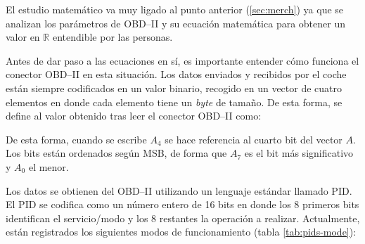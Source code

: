 El estudio matemático va muy ligado al punto anterior (\ref{sec:merch}) ya que se
analizan los parámetros de \ac{OBD}--II y su ecuación matemática para obtener un
valor en $\mathbb{R}$ entendible por las personas.

Antes de dar paso a las ecuaciones en sí, es importante entender cómo funciona
el conector \ac{OBD}--II en esta situación. Los datos enviados y recibidos por
el coche están siempre codificados en un valor binario, recogido en un vector
de cuatro elementos en donde cada elemento tiene un \textit{byte} de tamaño. De
esta forma, se define al valor obtenido tras leer el conector \ac{OBD}--II como:

\begin{table}[H]
  \centering
  \caption{Vector de \textit{bytes} que representa los datos recibidos del conector \ac{OBD}--II \cite{OBDIIPIDs2021}.}
  \label{tab:byte-array}
\end{table}

De esta forma, cuando se escribe $A_4$ se hace referencia al cuarto bit
del vector $A$. Los bits están ordenados según \ac{MSB}, de forma que
$A_7$ es el bit más significativo y $A_0$ el menor.

Los datos se obtienen del \ac{OBD}--II utilizando un lenguaje estándar llamado
\ac{PID}. El \ac{PID} se codifica como un número entero de 16 bits en donde los 8
primeros bits identifican el servicio/modo y los 8 restantes la operación a realizar.
Actualmente, están registrados los siguientes modos de funcionamiento (tabla
\ref{tab:pids-mode}):

